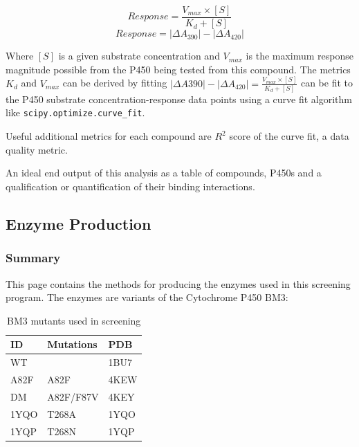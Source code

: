 \documentclass{article}
\begin{document}
\begin{enumerate}
\begin{enumerate}
\begin{enumerate}
				\begin{equation}
					Response = \frac{V_{max} \times [S]}{K_{d} + [S]}
				\end{equation}
				\begin{equation}
					Response = |\Delta A_{390}| - |\Delta A_{420}| 
				\end{equation}

		   Where $[S]$ is a given substrate concentration and $V_{max}$ is the maximum response magnitude possible from the P450 being tested from this compound.
				The metrics $K_d$ and $V_{max}$ can be derived by fitting $|\Delta A{390}| - |\Delta A_{420}|= \frac{V_{max} \times [S]}{K_{d} + [S]}$ can be fit to the P450 substrate concentration-response  data points using a curve fit algorithm like \texttt{scipy.optimize.curve\_fit}.

		   Useful additional metrics for each compound are $R^2$ score of the curve fit, a data quality metric. 

		   An ideal end output of this analysis as a table of compounds, P450s and a qualification or quantification of their binding interactions.

		\end{enumerate}
   \end{enumerate}
\end{enumerate}

\subsection{Enzyme Production}

\subsubsection{Summary}

This page contains the methods for producing the enzymes used in this screening program.
The enzymes are variants of the Cytochrome P450 BM3:

\begin{table}
	\begin{center}
		\caption{\label{bm3_table} BM3 mutants used in screening}
		\begin{tabular}{l|p{3cm}|l}
		\textbf{ID} & \textbf{Mutations} & \textbf{PDB} \\
		\hline 
		WT   &           & 1BU7 \\
		A82F &   A82F    & 4KEW \\
		DM   & A82F/F87V & 4KEY \\
		1YQO &   T268A   & 1YQO \\
		1YQP &   T268N   & 1YQP \\
		\end{tabular}
	\end{center}
\end{table}
\end{document}
